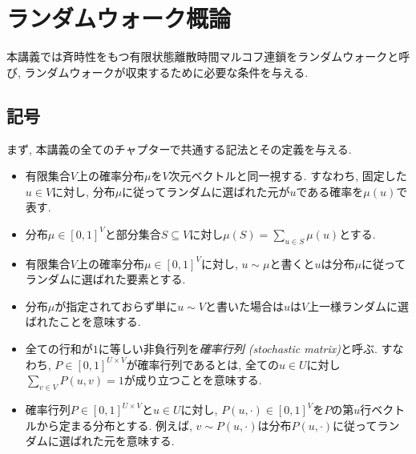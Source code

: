 \chapter{ランダムウォーク概論}
本講義では斉時性をもつ有限状態離散時間マルコフ連鎖をランダムウォークと呼び,
ランダムウォークが収束するために必要な条件を与える.

\section{記号}
まず, 本講義の全てのチャプターで共通する記法とその定義を与える.
\begin{itemize}
\item 有限集合$V$上の確率分布$\mu$を$V$次元ベクトルと同一視する.
すなわち, 固定した$u\in V$に対し, 分布$\mu$に従ってランダムに選ばれた元が$u$である確率を$\mu(u)$で表す.
\item 分布$\mu \in [0,1]^V$と部分集合$S\subseteq V$に対し$\mu(S) = \sum_{u\in S}\mu(u)$とする.
\item 有限集合$V$上の確率分布$\mu\in [0,1]^V$に対し, $u \sim \mu$と書くと$u$は分布$\mu$に従ってランダムに選ばれた要素とする.
\item 分布$\mu$が指定されておらず単に$u\sim V$と書いた場合は$u$は$V$上一様ランダムに選ばれたことを意味する.
\item 全ての行和が$1$に等しい非負行列を\emph{確率行列 (stochastic matrix)}と呼ぶ.
すなわち, $P \in [0,1]^{U\times V}$が確率行列であるとは, 全ての$u\in U$に対し$\sum_{v \in V} P(u,v) = 1$が成り立つことを意味する.
\item 確率行列$P\in [0,1]^{U\times V}$と$u\in U$に対し, $P(u,\cdot) \in [0,1]^V$を$P$の第$u$行ベクトルから定まる分布とする. 例えば, $v \sim P(u,\cdot)$は分布$P(u,\cdot)$に従ってランダムに選ばれた元を意味する.
\end{itemize}
